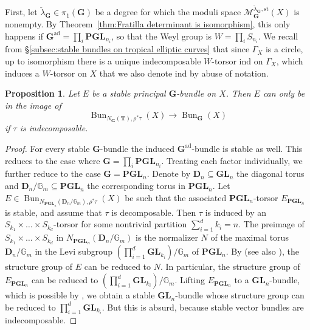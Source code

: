 \documentclass[10pt, a4paper]{amsart}
\newtheorem{proposition}[theorem]{Proposition}
\theoremstyle{definition}
\theoremstyle{myitemstyle}
\newcommand{\G}{\mathbb{G}}
\newcommand{\lambdacheck}{\check{\lambda}}
\newcommand{\bfG}{\mathbf{G}}
\newcommand{\bfT}{\mathbf{T}}
\newcommand{\bfD}{\mathbf{D}}
\newcommand{\bGL}{\mathbf{GL}}
\newcommand{\bPGL}{\mathbf{PGL}}
\newcommand{\mc}[1]{{\mathcal{#1}}}
\DeclareMathOperator{\Bun}{Bun}
\newcommand{\ind}{\mathrm{ind}}
\newcommand{\ad}{{\mathrm{ad}}}
\begin{document}
First, let $\lambdacheck_\mathbf{G}\in \pi_1(\mathbf{G})$ be a degree for which the moduli space $\mc M_\mathbf{G}^{\lambdacheck_\mathbf{G},\mathrm{st}}(X)$ is nonempty. By Theorem~\ref{thm:Fratilla determinant is isomorphism}, this only happens if $\mathbf{G}^\ad= \prod_i \bPGL_{n_i}$, so that the Weyl group is $W=\prod_i S_{n_i}$. We recall from \S\ref{subsec:stable bundles on tropical elliptic curves} that since $\Gamma_X$ is a circle, up to isomorphism there is a unique indecomposable $W$-torsor $\ind$ on $\Gamma_X$, which induces a $W$-torsor on $X$ that we also denote $\ind$ by abuse of notation. 


\begin{proposition}
    Let $E$ be a stable principal $\mathbf{G}$-bundle on $X$. Then $E$ can only be in the image of 
    \[
    \Bun_{N_\bfG(\bfT),\rho^*\tau}(X)\longrightarrow \Bun_\mathbf{G}(X)
    \]
    if $\tau$ is indecomposable.
\end{proposition}

\begin{proof}
    For every stable $\mathbf{G}$-bundle the induced $\mathbf{G}^\ad$-bundle is stable as well. This reduces to the case where $\mathbf{G}=\prod_i \bPGL_{n_i}$. Treating each factor individually, we further reduce to the case $\mathbf{G}=\bPGL_n$. Denote by $\mathbf D_n\subseteq \bGL_n$ the diagonal torus and $\mathbf D_n/\G_m\subseteq \bPGL_n$ the corresponding torus in $\bPGL_n$. Let $E\in \Bun_{N_{\bPGL_n}(\mathbf D_n/\G_m),\rho^*\tau}(X)$ be such that the associated $\bPGL_n$-torsor $E_{\bPGL_n}$ is stable, and assume that $\tau$ is decomposable. Then $\tau$ is induced by an $S_{k_1}\times \ldots \times S_{k_d}$-torsor for some nontrivial partition $\sum_{i=1}^d k_i=n$.  The preimage of $S_{k_1}\times\ldots \times S_{k_d}$ in $N_{\bPGL_n}(\bfD_n/\G_m)$ is the normalizer $N$ of the maximal torus $\mathbf D_n/\G_m$ in the Levi subgroup $\left(\prod_{i=1}^d \bGL_{k_i}\right)/\G_m$ of $\bPGL_n$. By \cite[Lemma 2.2.1]{BiswasHoffmann} (see also \cite{BiswasHoffmannError}), the structure group of $E$ can be reduced to $N$. In particular, the structure group of $E_{\bPGL_n}$ can be reduced to $\left(\prod_{i=1}^d \bGL_{k_i}\right)/\G_m$. Lifting $E_{\bPGL_n}$ to a $\bGL_n$-bundle, which is possible by \cite[Corollary 3.4]{Hoffmann}, we obtain a stable $\bGL_n$-bundle whose structure group can be reduced to $\prod_{i=1}^d \bGL_{k_i}$. But this is absurd, because stable vector bundles are indecomposable.
\end{proof}
\end{document}
